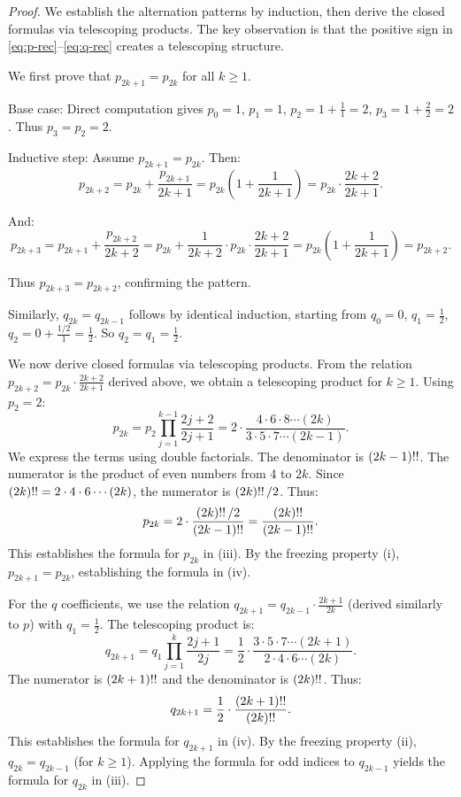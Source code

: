 \documentclass[11pt,reqno]{amsart}
\theoremstyle{definition}
\numberwithin{equation}{section}
\begin{document}
\begin{proof}
We establish the alternation patterns by induction, then derive the closed formulas via telescoping products. The key observation is that the positive sign in \eqref{eq:p-rec}--\eqref{eq:q-rec} creates a telescoping structure.

We first prove that $p_{2k+1} = p_{2k}$ for all $k \geq 1$.

Base case: Direct computation gives $p_0 = 1$, $p_1 = 1$, $p_2 = 1 + \frac{1}{1} = 2$, $p_3 = 1 + \frac{2}{2} = 2$. Thus $p_3 = p_2 = 2$.

Inductive step: Assume $p_{2k+1} = p_{2k}$. Then:
$$p_{2k+2} = p_{2k} + \frac{p_{2k+1}}{2k+1} = p_{2k}\left(1 + \frac{1}{2k+1}\right) = p_{2k} \cdot \frac{2k+2}{2k+1}.$$

And:
$$p_{2k+3} = p_{2k+1} + \frac{p_{2k+2}}{2k+2} = p_{2k} + \frac{1}{2k+2} \cdot p_{2k} \cdot \frac{2k+2}{2k+1} = p_{2k}\left(1 + \frac{1}{2k+1}\right) = p_{2k+2}.$$

Thus $p_{2k+3} = p_{2k+2}$, confirming the pattern.

Similarly, $q_{2k} = q_{2k-1}$ follows by identical induction, starting from $q_0 = 0$, $q_1 = \frac{1}{2}$, $q_2 = 0 + \frac{1/2}{1} = \frac{1}{2}$. So $q_2 = q_1 = \frac{1}{2}$.

We now derive closed formulas via telescoping products.
From the relation $p_{2k+2} = p_{2k} \cdot \frac{2k+2}{2k+1}$ derived above, we obtain a telescoping product for $k\ge 1$. Using $p_2 = 2$:
\[
p_{2k} = p_2 \prod_{j=1}^{k-1} \frac{2j+2}{2j+1} = 2 \cdot \frac{4 \cdot 6 \cdot 8 \cdots (2k)}{3 \cdot 5 \cdot 7 \cdots (2k-1)}.
\]
We express the terms using double factorials. The denominator is $(2k-1)\mskip-3mu\mathop{!!}$. The numerator is the product of even numbers from 4 to $2k$. Since $(2k)\mskip-3mu\mathop{!!} = 2 \cdot 4 \cdot 6 \cdots (2k)$, the numerator is $(2k)\mskip-3mu\mathop{!!}/2$. Thus:
\[
p_{2k} = 2 \cdot \frac{(2k)\mskip-3mu\mathop{!!}/2}{(2k-1)\mskip-3mu\mathop{!!}} = \frac{(2k)\mskip-3mu\mathop{!!}}{(2k-1)\mskip-3mu\mathop{!!}}.
\]
This establishes the formula for $p_{2k}$ in (iii). By the freezing property (i), $p_{2k+1}=p_{2k}$, establishing the formula in (iv).

For the $q$ coefficients, we use the relation $q_{2k+1} = q_{2k-1}\cdot\frac{2k+1}{2k}$ (derived similarly to $p$) with $q_1 = \frac{1}{2}$. The telescoping product is:
\[
q_{2k+1} = q_1 \prod_{j=1}^{k} \frac{2j+1}{2j} = \frac{1}{2} \cdot \frac{3 \cdot 5 \cdot 7 \cdots (2k+1)}{2 \cdot 4 \cdot 6 \cdots (2k)}.
\]
The numerator is $(2k+1)\mskip-3mu\mathop{!!}$ and the denominator is $(2k)\mskip-3mu\mathop{!!}$. Thus:
\[
q_{2k+1} = \frac{1}{2} \cdot \frac{(2k+1)\mskip-3mu\mathop{!!}}{(2k)\mskip-3mu\mathop{!!}}.
\]
This establishes the formula for $q_{2k+1}$ in (iv). By the freezing property (ii), $q_{2k}=q_{2k-1}$ (for $k\ge 1$). Applying the formula for odd indices to $q_{2k-1}$ yields the formula for $q_{2k}$ in (iii).
\end{proof}
\end{document}
